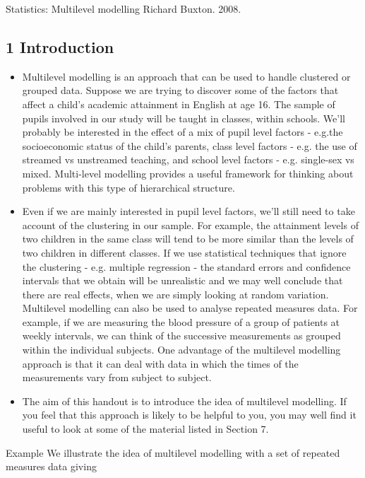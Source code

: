 
Statistics: Multilevel modelling
Richard Buxton. 2008.

\subsection{1 Introduction}
\begin{itemize}
\item Multilevel modelling is an approach that can be used to handle clustered or grouped data.
Suppose we are trying to discover some of the factors that affect a child’s academic
attainment in English at age 16. The sample of pupils involved in our study will be
taught in classes, within schools. We’ll probably be interested in the effect of a mix of
pupil level factors - e.g.the socioeconomic status of the child’s parents, class level factors -
e.g. the use of streamed vs unstreamed teaching, and school level factors - e.g. single-sex
vs mixed. Multi-level modelling provides a useful framework for thinking about problems
with this type of hierarchical structure.
\item Even if we are mainly interested in pupil level factors, we’ll still need to take account of
the clustering in our sample. For example, the attainment levels of two children in the
same class will tend to be more similar than the levels of two children in different classes.
If we use statistical techniques that ignore the clustering - e.g. multiple regression - the
standard errors and confidence intervals that we obtain will be unrealistic and we may
well conclude that there are real effects, when we are simply looking at random variation.
Multilevel modelling can also be used to analyse repeated measures data. For example,
if we are measuring the blood pressure of a group of patients at weekly intervals, we can
think of the successive measurements as grouped within the individual subjects. One
advantage of the multilevel modelling approach is that it can deal with data in which the
times of the measurements vary from subject to subject.
\item The aim of this handout is to introduce the idea of multilevel modelling. If you feel that
this approach is likely to be helpful to you, you may well find it useful to look at some of
the material listed in Section 7.
\end{itemize}
 Example
We illustrate the idea of multilevel modelling with a set of repeated measures data giving
